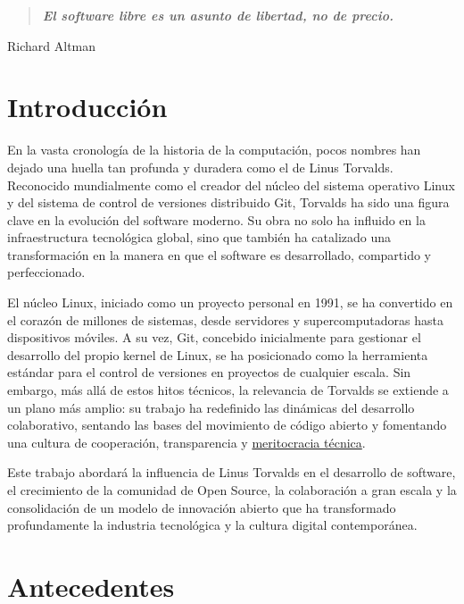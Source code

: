 \documentclass[a4paper,12pt]{article}
\begin{document}
\tableofcontents

\newpage
\hypersetup{linkcolor=blue, urlcolor=blue, citecolor=blue}


\begin{quote}
    \textbf{\textit{El software libre es un asunto de libertad, no de precio.}} 
\end{quote}
\begin{flushright}
Richard Altman
\end{flushright}


\section{Introducción}

En la vasta cronología de la historia de la computación, pocos nombres han
dejado una huella tan profunda y duradera como el de Linus Torvalds. Reconocido
mundialmente como el creador del núcleo del sistema operativo Linux y del
sistema de control de versiones distribuido Git, Torvalds ha sido una figura
clave en la evolución del software moderno. Su obra no solo ha influido en la
infraestructura tecnológica global, sino que también ha catalizado una
transformación en la manera en que el software es desarrollado, compartido y
perfeccionado.

El núcleo Linux, iniciado como un proyecto personal en 1991, se ha convertido en
el corazón de millones de sistemas, desde servidores y supercomputadoras hasta
dispositivos móviles. A su vez, Git, concebido inicialmente para gestionar el
desarrollo del propio kernel de Linux, se ha posicionado como la herramienta
estándar para el control de versiones en proyectos de cualquier escala. Sin
embargo, más allá de estos hitos técnicos, la relevancia de Torvalds se extiende
a un plano más amplio: su trabajo ha redefinido las dinámicas del desarrollo
colaborativo, sentando las bases del movimiento de código abierto y fomentando
una cultura de cooperación, transparencia y \hyperlink{meritocracia}{meritocracia técnica}.

Este trabajo abordará la influencia de Linus Torvalds en el desarrollo de
software, el crecimiento de la comunidad de Open Source, la colaboración a gran
escala y la consolidación de un modelo de innovación abierto que ha transformado
profundamente la industria tecnológica y la cultura digital contemporánea.  
\newpage

\section{Antecedentes} 
\end{document}
